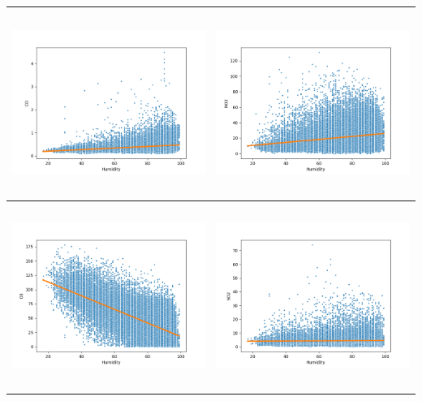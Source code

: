 \documentclass[18pt, letterpaper]{article}
\begin{document}
\begin{table}[H]
\centering
\begin{tabular}{|c|c|}
\hline
\includegraphics[width=80mm,height=60mm]{visualisations/corr_plots/HumidityxCO_scatter.png}  & \includegraphics[width=80mm,height=60mm]{visualisations/corr_plots/HumidityxNO2_scatter.png} \\ \hline
\includegraphics[width=80mm,height=60mm]{visualisations/corr_plots/HumidityxO3_scatter.png}  & \includegraphics[width=80mm,height=60mm]{visualisations/corr_plots/HumidityxSO2_scatter.png} \\ \hline

\end{tabular}
\end{table}
\end{document}
